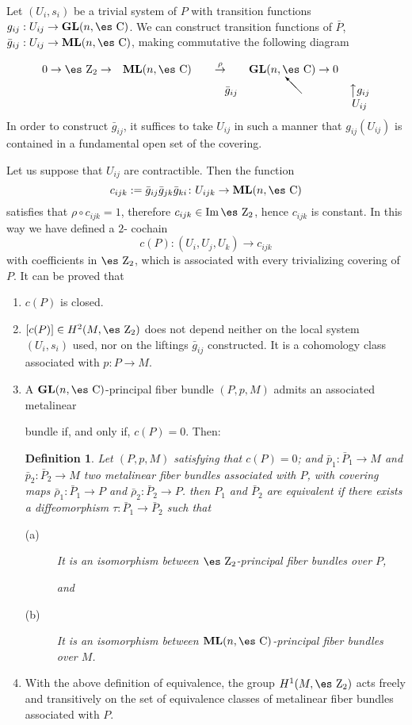 \documentclass[12pt]{article}
\newtheorem{definition}{Definition}
\def\map#1{\mathrel{\mathop{\to}\limits^{#1}}}
\def\GL{{\bf GL}(n,\Complex )}
\def\ML{{\bf ML}(n,\Complex )}
\def\Zahl{\mbox{\es Z}}
\def\Complex{\mbox{\es C}}
\begin{document}
Let $(U_i,s_i)$ be a trivial system of $P$ with transition functions
$g_{ij} : U_{ij} \to \GL$. We can construct transition functions of
$\bar P$,
$\bar g_{ij} : U_{ij} \to \ML$, making commutative the following diagram

$$
\begin{array}{ccccc}
0 \to \Zahl_2 \to & \ML & \map{\rho} & \GL \to 0
\\
& & \qquad \bar g_{ij}
&
\begin{picture}(15,15)(0,0)
\put(15,0){\vector(-1,1){15}}
\end{picture}
& \big\uparrow g_{ij}
\\
& & & & U_{ij}
\end{array}
$$
In order to construct $\bar g_{ij}$, it suffices to take $U_{ij}$
in such a manner that $g_{ij}(U_{ij})$
is contained in a fundamental open set of the covering.

Let us suppose that $U_{ij}$ are contractible. Then the function
$$
c_{ijk} := \bar g_{ij} \bar g_{jk} \bar g_{ki} \colon U_{ijk} \to \ML
$$
satisfies that $\rho \circ c_{ijk} = 1$, therefore
$c_{ijk} \in {\rm Im}\, \Zahl_2$, hence $c_{ijk}$ is constant.
In this way we have defined a $2$- cochain
$$
c(P) : (U_i,U_j,U_k) \to c_{ijk}
$$
with coefficients in $\Zahl_2$,
which is associated with every trivializing covering of $P$.
It can be proved that
\begin{enumerate}
\item
$c(P)$ is closed.
\item
$[c(P)] \in H^2(M,\Zahl_2)$ does not depend neither on the local system
$(U_i,s_i)$ used, nor on the liftings $\bar g_{ij}$ constructed.
It is a cohomology class associated with $p\colon P \to M$.
\item
A $\GL$-principal fiber bundle $(P,p,M)$ admits an associated metalinear

bundle
if, and only if, $c(P)=0$. Then:

\begin{definition}
Let $(P,p,M)$ satisfying that $c(P)=0$; and
$\bar p_1:\bar P_1 \to M$ and $\bar p_2:\bar P_2 \to M$
two metalinear fiber bundles associated with $P$,
with covering maps $\bar \rho_1\colon\bar P_1 \to P$ and
$\bar \rho_2\colon\bar P_2 \to P$. then $P_1$ and $\bar P_2$ are
{\rm equivalent} if there exists a diffeomorphism
$\tau : \bar P_1 \to \bar P_2$ such that
\begin{description}
\item[{\rm (a)}]
It is an isomorphism between $\Zahl_2$-principal fiber bundles over $P$,

and
\item[{\rm (b)}]
It is an isomorphism between $\ML$-principal fiber bundles over $M$.
\end{description}
\label{amfbeq}
\end{definition}

\item
With the above definition of equivalence, the group $H^1(M,\Zahl_2)$
acts freely and transitively on the set of equivalence classes of
metalinear fiber bundles associated with $P$.
\end{enumerate}
\end{document}
